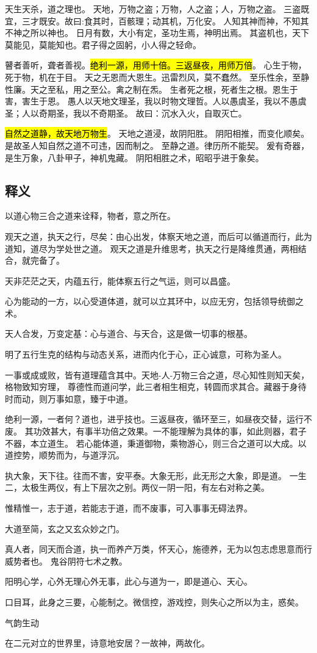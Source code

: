 天生天杀，道之理也。
天地，万物之盗；万物，人之盗；人，万物之盗。
三盗既宜，三才既安。故曰:食其时，百骸理；动其机，万化安。
人知其神而神，不知其不神之所以神也。
日月有数，大小有定，圣功生焉，神明出焉。
其盗机也，天下莫能见，莫能知也。君子得之固躬，小人得之轻命。 

瞽者善听，聋者善视。\hl{绝利一源，用师十倍。三返昼夜，用师万倍}。
心生于物，死于物，机在于目。
天之无恩而大恩生。迅雷烈风，莫不蠢然。
至乐性余，至静性廉。天之至私，用之至公。禽之制在炁。
生者死之根，死者生之根。恩生于害，害生于恩。
愚人以天地文理圣，我以时物文理哲。人以愚虞圣，我以不愚虞圣；人以奇期圣，我以不奇期圣。
故曰：沉水入火，自取灭亡。

\hl{自然之道静，故天地万物生}。
天地之道浸，故阴阳胜。
阴阳相推，而变化顺矣。是故圣人知自然之道不可违，因而制之。
至静之道。律历所不能契。
爰有奇器，是生万象，八卦甲子，神机鬼藏。
阴阳相胜之术，昭昭乎进于象矣。 

\subsection{释义}

以道心物三合之道来诠释，物者，意之所在。

观天之道，执天之行，尽矣：由心出发，体察天地之道，而后可以循道而行，此为道知，道尽为学处世之道。
观天之道是升维思考，执天之行是降维贯通，两相结合，就完备了。

天非茫茫之天，内蕴五行，能体察五行之气运，则可以昌盛。

心为能动的一方，以心受道体道，就可以立其环中，以应无穷，包括领导统御之术。

天人合发，万变定基：心与道合、与天合，这是做一切事的根基。

明了五行生克的结构与动态关系，进而内化于心，正心诚意，可称为圣人。

一事或成或败，皆有道理蕴含其中。天地-人-万物三合之道，尽心知性则知天矣，格物致知穷理，
尊德性而道问学，此三者相生相克，转圆而求其合。藏器于身待时而动，则万事如意，臻于中道。

绝利一源，一者何？道也，进乎技也。三返昼夜，循环至三，如昼夜交替，运行不废。
其功效甚大，有事半功倍之效果。一不能理解为具体的事，如此则器，君子不器，本立道生。
若心能体道，秉道御物，乘物游心，则三合之道可以大成。以道控势，顺势而为，与道浮沉。

执大象，天下往。往而不害，安平泰。大象无形，此无形之大象，即是道。
一生二，太极生两仪，有上下层次之别。两仪一阴一阳，有左右对称之美。

惟精惟一，志于道，若能志于道，而不废事，可入事事无碍法界。

大道至简，玄之又玄众妙之门。

真人者，同天而合道，执一而养产万类，怀天心，施德养，无为以包志虑思意而行威势者也。
鬼谷阴符七术之教。

阳明心学，心外无理心外无事，此心与道为一，即是道心、天心。

口目耳，此身之三要，心能制之。微信控，游戏控，则失心之所以为主，惑矣。

气韵生动

在二元对立的世界里，诗意地安居？一故神，两故化。
